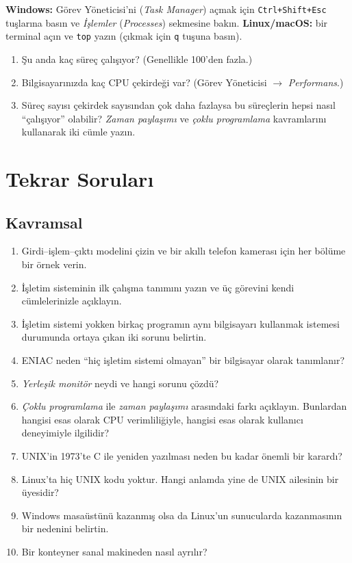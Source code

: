 \documentclass[11pt,a4paper]{article}
\newcommand{\cmd}[1]{\texttt{#1}}
\begin{document}
\begin{tryit}
\textbf{Windows:} Görev Yöneticisi'ni (\emph{Task Manager}) açmak için \cmd{Ctrl+Shift+Esc} tuşlarına basın ve \emph{İşlemler} (\emph{Processes}) sekmesine bakın. \textbf{Linux/macOS:} bir terminal açın ve \cmd{top} yazın (çıkmak için \cmd{q} tuşuna basın).
\begin{enumerate}[leftmargin=1.4em]
  \item Şu anda kaç süreç çalışıyor? (Genellikle 100'den fazla.)
  \item Bilgisayarınızda kaç CPU çekirdeği var? (Görev Yöneticisi $\to$ \emph{Performans}.)
  \item Süreç sayısı çekirdek sayısından çok daha fazlaysa bu süreçlerin hepsi nasıl ``çalışıyor'' olabilir? \emph{Zaman paylaşımı} ve \emph{çoklu programlama} kavramlarını kullanarak iki cümle yazın.
\end{enumerate}
\end{tryit}

\section{Tekrar Soruları}

\subsection*{Kavramsal}
\begin{enumerate}[leftmargin=1.6em]
  \item Girdi--işlem--çıktı modelini çizin ve bir akıllı telefon kamerası için her bölüme bir örnek verin.
  \item İşletim sisteminin ilk çalışma tanımını yazın ve üç görevini kendi cümlelerinizle açıklayın.
  \item İşletim sistemi yokken birkaç programın aynı bilgisayarı kullanmak istemesi durumunda ortaya çıkan iki sorunu belirtin.
  \item ENIAC neden ``hiç işletim sistemi olmayan'' bir bilgisayar olarak tanımlanır?
  \item \emph{Yerleşik monitör} neydi ve hangi sorunu çözdü?
  \item \emph{Çoklu programlama} ile \emph{zaman paylaşımı} arasındaki farkı açıklayın. Bunlardan hangisi esas olarak CPU verimliliğiyle, hangisi esas olarak kullanıcı deneyimiyle ilgilidir?
  \item UNIX'in 1973'te C ile yeniden yazılması neden bu kadar önemli bir karardı?
  \item Linux'ta hiç UNIX kodu yoktur. Hangi anlamda yine de UNIX ailesinin bir üyesidir?
  \item Windows masaüstünü kazanmış olsa da Linux'un sunucularda kazanmasının bir nedenini belirtin.
  \item Bir konteyner sanal makineden nasıl ayrılır?
\end{enumerate}
\end{document}
